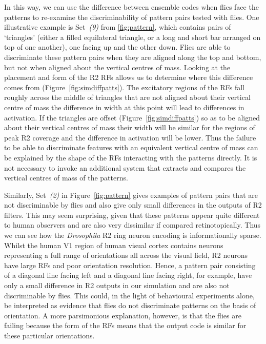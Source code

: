 In this way, we can use the difference between ensemble codes when flies face the patterns to re-examine the discriminability of pattern pairs tested with flies. One illustrative example is Set~\emph{(9)} from \ref{fig:pattern}, which contains pairs of ‘triangles’ (either a filled equilateral triangle, or a long and short bar arranged on top of one another), one facing up and the other down. Flies are able to discriminate these pattern pairs when they are aligned along the top and bottom, but not when aligned about the vertical centres of mass\cite{Ernst1999}. Looking at the placement and form of the R2 RFs allows us to determine where this difference comes from (Figure~\ref{fig:simdiffpatts}). The excitatory regions of the RFs fall roughly across the middle of triangles that are not aligned about their vertical centre of mass the difference in width at this point will lead to differences in activation. If the triangles are offset (Figure~\ref{fig:simdiffpatts}) so as to be aligned about their vertical centres of mass their width will be similar for the regions of peak R2 coverage and the difference in activation will be lower. Thus the failure to be able to discriminate features with an equivalent vertical centre of mass can be explained by the shape of the RFs interacting with the patterns directly. It is not necessary to invoke an additional system that extracts and compares the vertical centres of mass of the patterns.

Similarly, Set~\emph{(2)} in Figure~\ref{fig:pattern} gives examples of pattern pairs that are not discriminable by flies and also give only small differences in the outputs of R2 filters. This may seem surprising, given that these patterns appear quite different to human observers and are also very dissimilar if compared retinotopically. Thus we can see how the \emph{Drosophila} R2 ring neuron encoding is informationally sparse. Whilst the human V1 region of human visual cortex contains neurons representing a full range of orientations all across the visual field, R2 neurons have large RFs and poor orientation resolution. Hence, a pattern pair consisting of a diagonal line facing left and a diagonal line facing right, for example, have only a small difference in R2 outputs in our simulation and are also not discriminable by flies. This could, in the light of behavioural experiments alone, be interpreted as evidence that flies do not discriminate patterns on the basis of orientation. A more parsimonious explanation, however, is that the flies are failing because the form of the RFs means that the output code is similar for these particular orientations.

